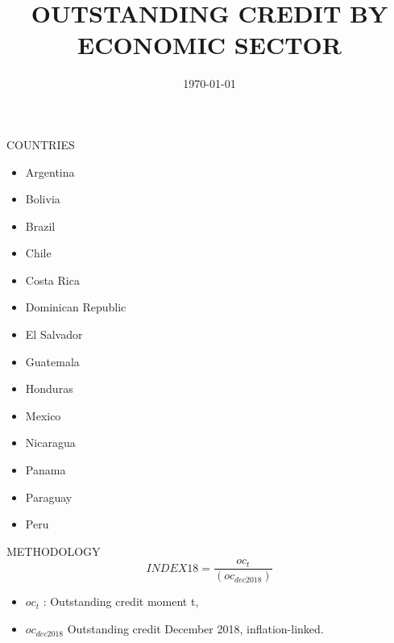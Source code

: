 \documentclass{beamer}
\title[Credit Type]{OUTSTANDING CREDIT BY ECONOMIC SECTOR}
\date{\today}
\begin{document}
	\begin{frame}
		\begin{center}
		\end{center}
	\end{frame}

\begin{frame}
    COUNTRIES
    \begin{multicols}{3}
	\begin{itemize}
		\item Argentina
		\item Bolivia
		\item Brazil
		\item Chile
		\item Costa Rica
		\item Dominican Republic
		\item El Salvador
		\item Guatemala
		\item Honduras
		\item Mexico
		\item Nicaragua
		\item Panama
		\item Paraguay
		\item Peru
	\end{itemize}
\end{multicols}	
\end{frame}
%
\begin{frame}
	METHODOLOGY
	\begin{equation}
	INDEX18=\frac{oc_{t}}{(oc_{dec2018})}
	\end{equation}
	{\footnotesize
		\begin{itemize}
			\item $oc_{t}$ : Outstanding credit moment t,
			\item $oc_{dec2018}$ Outstanding credit December 2018, inflation-linked.
	\end{itemize}}
\end{frame}
\end{document}
